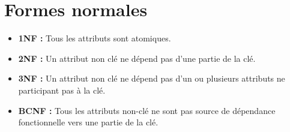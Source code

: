     \section{Formes normales}
        \begin{itemize}
            \item \textbf{1NF :} Tous les attributs sont atomiques.
            \item \textbf{2NF :} Un attribut non clé ne dépend pas d'une partie de la clé.
            \item \textbf{3NF :} Un attribut non clé ne dépend pas d'un ou plusieurs attributs ne participant pas à la clé.
            \item \textbf{BCNF :} Tous les attributs non-clé ne sont pas source de dépendance fonctionnelle vers une partie de la clé.
        \end{itemize}



